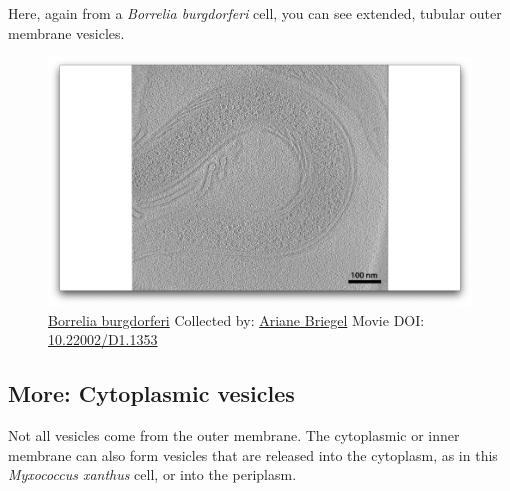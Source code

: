 \documentclass[]{tufte-book}
\begin{document}
Here, again from a \emph{Borrelia burgdorferi} cell, you can see
extended, tubular outer membrane vesicles.





\begin{figure}
\includegraphics{movie_stills/2_4b} \caption[\protect\hyperlink{tree}{Borrelia burgdorferi} Collected by:
\protect\hyperlink{ariane_briegel}{Ariane Briegel} Movie DOI:
\href{https://doi.org/10.22002/D1.1353}{10.22002/D1.1353}]{\protect\hyperlink{tree}{Borrelia burgdorferi} Collected by:
\protect\hyperlink{ariane_briegel}{Ariane Briegel} Movie DOI:
\href{https://doi.org/10.22002/D1.1353}{10.22002/D1.1353}}\label{fig:2-4b}
\end{figure}

\hypertarget{Cytoplasmic_vesicles}{\subsection*{More: Cytoplasmic
vesicles}\label{Cytoplasmic_vesicles}}

Not all vesicles come from the outer membrane. The cytoplasmic or inner
membrane can also form vesicles that are released into the cytoplasm, as
in this \emph{Myxococcus xanthus} cell, or into the periplasm.
\end{document}
